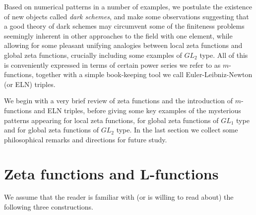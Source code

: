 \documentclass[paper=a4, fontsize=11pt]{scrartcl} %
\numberwithin{equation}{section} %
\numberwithin{figure}{section} %
\numberwithin{table}{section} %
\begin{document}
Based on numerical patterns in a number of examples, we postulate the existence of new objects called \emph{dark schemes}, and make some observations suggesting that a good theory of dark schemes may circumvent some of the finiteness problems seemingly inherent in other approaches to the field with one element, while allowing for some pleasant unifying analogies between local zeta functions and global zeta functions, crucially including some examples of $GL_2$ type. All of this is conveniently expressed in terms of certain power series we refer to as $m$-functions, together with a simple book-keeping tool we call Euler-Leibniz-Newton (or ELN) triples.

We begin with a very brief review of zeta functions and the introduction of $m$-functions and ELN triples, before giving some key examples of the mysterious patterns appearing for local zeta functions, for global zeta functions of $GL_1$ type and for global zeta functions of $GL_2$ type. In the last section we collect some philosophical remarks and directions for future study.



\section{Zeta functions and L-functions}

We assume that the reader is familiar with (or is willing to read about) the following three constructions.
\end{document}
